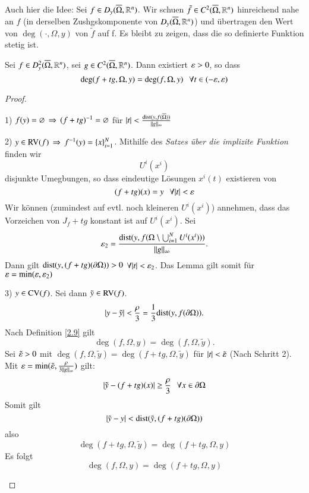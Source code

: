 Auch hier die Idee: Sei $f\in D_y(\overline \Omega, \mathbb{R}^n)$. Wir schuen $\tilde f \in C^2 (\overline \Omega, \mathbb{R}^n)$
hinreichend nahe an $f$ (in derselben Zushgskomponente von $D_y(\overline \Omega, \mathbb{R}^n)$) und übertragen
den Wert von $\deg(\cdot , \Omega, y)$ von $\tilde f$ auf f. Es bleibt zu zeigen, dass die so definierte
Funktion stetig ist.

\begin{lem}\label{2.10}
    Sei $f\in D_y^2(\overline \Omega, \mathbb{R}^n)$, sei $g\in C^2(\overline \Omega, \mathbb{R}^n)$. Dann existiert $\varepsilon >0$, so 
    dass
    \[
        \deg (f+tg,\Omega,y)= \deg(f,\Omega,y) \hspace{.25cm} \forall t\in (-\varepsilon,\varepsilon)
    \]
\end{lem}
\begin{proof}
    \begin{description}
        \item{1)}
        $f(y)=\varnothing \, \Rightarrow \, (f+tg)^{-1}=\varnothing$ für $|t|
        <\frac{\mathrm{dist}(y,f(\overline \Omega))}{\|g\|_\infty}$
        \item{2)}
        $y\in \mathrm{RV} (f) \, \Rightarrow \, f^{-1}(y)=\{x\}_{i=1}^N$. Mithilfe des \textit{Satzes über die 
            implizite Funktion} finden wir
            \[
                U^i(x^i)
            \]
            disjunkte Umegbungen, so dass eindeutige Lösungen $x^i(t)$ existieren von
            \[
                (f+tg)(x)=y \hspace{.25cm} \forall |t|<\varepsilon
            \]
            Wir können (zumindest auf evtl. noch kleineren $U^i(x^i)$) annehmen, dass das Vorzeichen
            von $J_f+tg$ konstant ist auf $U^i(x^i)$. Sei 
            \[
                \varepsilon _2= \frac{\mathrm{dist}(y,f(\Omega\setminus \bigcup_{i=1}^NU^i(x^i)))}{\|g\|_\infty}.
            \]
            Dann gilt $\mathrm{dist}(y,(f+tg)(\partial \Omega))>0$ $\forall |t|<\varepsilon_2$. Das Lemma gilt somit
            für $\varepsilon = \min(\varepsilon,\varepsilon_2)$
        \item{3)}
            $y\in \mathrm{CV}(f)$. Sei dann $\tilde y\in \mathrm{RV}(f)$.
            \[
                |y-\tilde y|< \frac{\rho}{3} = \frac13 \mathrm{dist}(y,f(\partial \Omega)).
            \]
            Nach Definition \ref{2.9} gilt
            \[
                \deg (f,\Omega,y)=\deg(f,\Omega,\tilde y).
            \]
            Sei $\tilde {\varepsilon}>0$ mit $\deg(f,\Omega,\tilde y)=\deg(f+tg,\Omega,\tilde y)$ für $|t|<\tilde
            {\varepsilon}$ (Nach Schritt 2).
            Mit $\varepsilon=\min(\tilde {\varepsilon} , \frac{\rho}{3\|g\|_\infty})$ gilt:
            \[
                |\tilde y-(f+tg)(x)|\geq \frac{\rho}{3} \hspace{.25cm} \forall x \in \partial \Omega
            \]
            Somit gilt
            \[
                |\tilde y-y|< \mathrm{dist} (\tilde y, (f+tg)(\partial \Omega))
            \]
            also
            \[
                \deg(f+tg,\Omega,\tilde y)= \deg (f+tg,\Omega,y)
            \]
            Es folgt
            \[
                \deg(f,\Omega, y)= \deg(f+tg,\Omega,y)
            \]
    \end{description}
    \[ \]
\end{proof}

